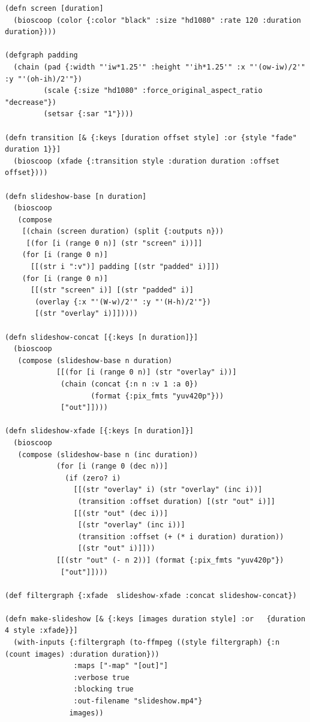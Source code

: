 \documentclass[english,submission]{programming}
\begin{document}
\begin{lstlisting}[caption={Slideshow generator (excerpt)}]
(defn screen [duration]
  (bioscoop (color {:color "black" :size "hd1080" :rate 120 :duration duration})))

(defgraph padding
  (chain (pad {:width "'iw*1.25'" :height "'ih*1.25'" :x "'(ow-iw)/2'" :y "'(oh-ih)/2'"})
         (scale {:size "hd1080" :force_original_aspect_ratio "decrease"})
         (setsar {:sar "1"})))

(defn transition [& {:keys [duration offset style] :or {style "fade" duration 1}}]
  (bioscoop (xfade {:transition style :duration duration :offset offset})))

(defn slideshow-base [n duration]
  (bioscoop
   (compose
    [(chain (screen duration) (split {:outputs n}))
     [(for [i (range 0 n)] (str "screen" i))]]
    (for [i (range 0 n)]
      [[(str i ":v")] padding [(str "padded" i)]])
    (for [i (range 0 n)]
      [[(str "screen" i)] [(str "padded" i)]
       (overlay {:x "'(W-w)/2'" :y "'(H-h)/2'"})
       [(str "overlay" i)]]))))

(defn slideshow-concat [{:keys [n duration]}]
  (bioscoop
   (compose (slideshow-base n duration)
            [[(for [i (range 0 n)] (str "overlay" i))]
             (chain (concat {:n n :v 1 :a 0})
                    (format {:pix_fmts "yuv420p"}))
             ["out"]])))

(defn slideshow-xfade [{:keys [n duration]}]
  (bioscoop
   (compose (slideshow-base n (inc duration))
            (for [i (range 0 (dec n))]
              (if (zero? i)
                [[(str "overlay" i) (str "overlay" (inc i))]
                 (transition :offset duration) [(str "out" i)]]
                [[(str "out" (dec i))]
                 [(str "overlay" (inc i))]
                 (transition :offset (+ (* i duration) duration))
                 [(str "out" i)]]))
            [[(str "out" (- n 2))] (format {:pix_fmts "yuv420p"})
             ["out"]])))

(def filtergraph {:xfade  slideshow-xfade :concat slideshow-concat})

(defn make-slideshow [& {:keys [images duration style] :or   {duration 4 style :xfade}}]
  (with-inputs {:filtergraph (to-ffmpeg ((style filtergraph) {:n (count images) :duration duration}))
                :maps ["-map" "[out]"]
                :verbose true
                :blocking true
                :out-filename "slideshow.mp4"}
               images))
\end{lstlisting}
\end{document}
